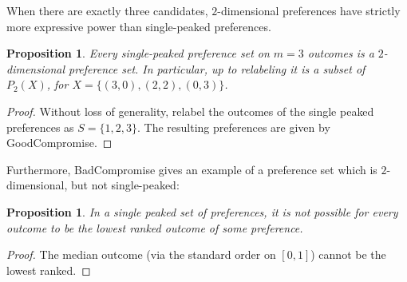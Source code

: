 \documentclass[12pt]{article}
\newtheorem{proposition}[theorem]{Proposition}
\newcommand{\1}[1]{\mathds{1}[{#1}]}
\begin{document}
  When there are exactly three candidates, $2$-dimensional
  preferences have strictly more expressive power than
  single-peaked preferences.
  \begin{proposition}
    Every single-peaked preference set on $m=3$ outcomes
    is a $2$-dimensional preference set. In particular,
    up to relabeling it is a subset of $P_2(X)$, for
    $X = \{ (3,0), (2,2), (0,3) \}$.
  \end{proposition}
  \begin{proof}
    Without loss of generality, relabel the outcomes
    of the single peaked preferences as $S = \{1,2,3\}$.
    The resulting preferences are given by {\sc GoodCompromise}.
  \end{proof}
  Furthermore, {\sc BadCompromise} gives an example of a preference set
  which is $2$-dimensional, but not single-peaked:
  \begin{proposition} \label{prop:noLeastFavorite}
    In a single peaked set of preferences, it is not possible
    for every outcome to be the lowest ranked outcome of some preference.
  \end{proposition}
  \begin{proof}
    The median outcome (via the standard order on $[0,1]$)
    cannot be the lowest ranked.
  \end{proof}
\end{document}
